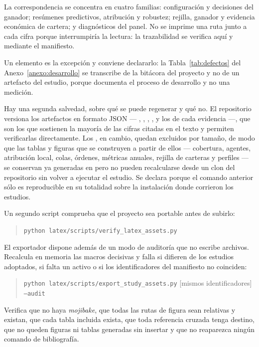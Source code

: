 La correspondencia se concentra en cuatro familias: configuración y decisiones del ganador;
resúmenes predictivos, atribución y robustez; rejilla, ganador y evidencia económica de cartera; y
diagnósticos del panel. No se imprime una ruta junto a cada cifra porque interrumpiría la lectura: la
trazabilidad se verifica aquí y mediante el manifiesto.

Un elemento es la excepción y conviene declararlo: la Tabla~\ref{tab:defectos} del
Anexo~\ref{anexo:desarrollo} se transcribe de la bitácora del proyecto y no de un artefacto del
estudio, porque documenta el proceso de desarrollo y no una medición.

Hay una segunda salvedad, sobre qué se puede regenerar y qué no. El repositorio versiona los
artefactos en formato JSON --- , ,
, ,  y los
 de cada evidencia ---, que son los que sostienen la mayoría de las cifras
citadas en el texto y permiten verificarlas directamente. Los , en cambio,
quedan excluidos por tamaño, de modo que las tablas y figuras que se construyen a partir de ellos
--- cobertura, agentes, atribución local, colas, órdenes, métricas anuales, rejilla de carteras y
perfiles --- se conservan ya generadas en  pero no pueden recalcularse
desde un clon del repositorio sin volver a ejecutar el estudio. Se declara porque el comando
anterior sólo es reproducible en su totalidad sobre la instalación donde corrieron los estudios.

Un segundo script comprueba que el proyecto sea portable antes de subirlo:

\begin{quote}
\small\nolinkurl{python latex/scripts/verify_latex_assets.py}
\end{quote}

El exportador dispone además de un modo de auditoría que no escribe archivos. Recalcula en memoria
las macros decisivas y falla si difieren de los estudios adoptados, si falta un activo o si los
identificadores del manifiesto no coinciden:

\begin{quote}
\small\nolinkurl{python latex/scripts/export_study_assets.py} [mismos identificadores] \texttt{--audit}
\end{quote}

Verifica que no haya \textit{mojibake}, que todas las rutas de figura sean relativas y existan, que
cada tabla incluida exista, que toda referencia cruzada tenga destino, que no queden figuras ni
tablas generadas sin insertar y que no reaparezca ningún comando de bibliografía.


